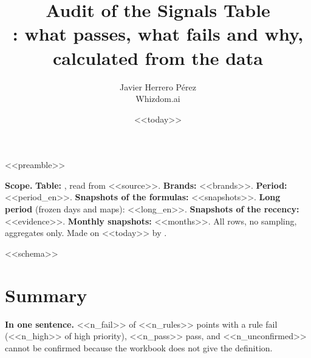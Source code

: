 <<preamble>>
\newcommand{\auditpoint}[6]{%
  \needspace{7\baselineskip}\item\label{#1}\textbf{#2}\par
  \begin{tabular}{@{}p{2.3cm}@{}p{\dimexpr\linewidth-2.3cm}@{}}
    \textcolor{MidnightBlue}{\textbf{Result}} & #3\\[2pt]
    \if\relax\detokenize{#4}\relax\else\textcolor{Plum}{\textbf{Definition}} & #4\\[2pt]\fi
    \if\relax\detokenize{#5}\relax\else\textcolor{ForestGreen!70!black}{\textbf{Proposal}} & #5\\[2pt]\fi
    \if\relax\detokenize{#6}\relax\else\textcolor{MidnightBlue}{\textbf{Evidence}} & #6\fi
  \end{tabular}\par\vspace{5pt}}

\title{\textbf{Audit of the Signals Table}\\[2pt]\large{}: what passes, what fails and why, calculated from the data}
\date{<<today>>}
\author{Javier Herrero Pérez \\ Whizdom.ai}


\maketitle
\vspace{-1.2cm}

\textbf{Scope.} \textbf{Table:} , read from <<source>>. \textbf{Brands:} <<brands>>. \textbf{Period:} <<period_en>>. \textbf{Snapshots of the formulas:} <<snapshots>>. \textbf{Long period} (frozen days and maps): <<long_en>>. \textbf{Snapshots of the recency:} <<evidence>>. \textbf{Monthly snapshots:} <<months>>. All rows, no sampling, aggregates only. Made on <<today>> by .

<<schema>>

\section{Summary}\label{sec:summary}
\textbf{In one sentence.} <<n_fail>> of <<n_rules>> points with a rule fail (<<n_high>> of high priority), <<n_pass>> pass, and <<n_unconfirmed>> cannot be confirmed because the workbook does not give the definition.

\begin{center}

\end{center}

